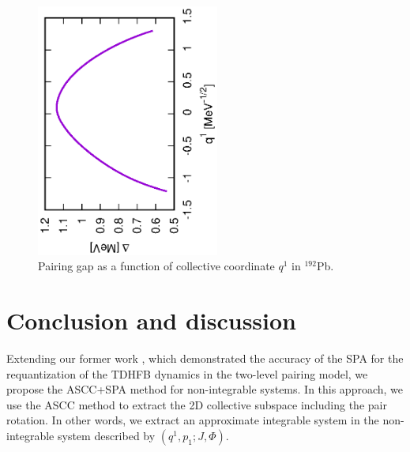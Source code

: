 \documentclass[%
superscriptaddress,
showpacs,
nofootinbib,
amsmath,amssymb,
aps,
prc,
twocolumn,
floatfix ]%
{revtex4-1}
\begin{document}

\begin{figure}[t]
 \begin{center}
  \includegraphics[width=60mm,angle=-90]{192Pbgap.eps}
 \end{center}
	\caption{Pairing gap as a function of collective coordinate $q^1$
	in ${}^{192}$Pb. 
}
 \label{192Pb_gap}
\end{figure}

\section{Conclusion and discussion}
\label{sec5}

Extending our former work \cite{NN18},
which demonstrated the accuracy of the SPA for the requantization
of the TDHFB dynamics in the two-level pairing model, 
we propose the ASCC+SPA method for non-integrable systems.
In this approach, we use the ASCC method to extract the 2D
collective subspace including the pair rotation.
In other words, we extract an approximate integrable system 
in the non-integrable system described by $(q^1,p_1;J,\Phi)$.
\end{document}
